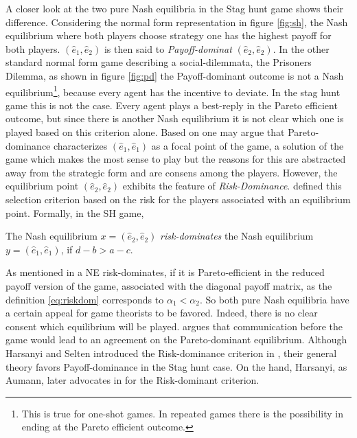 \documentclass[11pt]{article}
\begin{document}
A closer look at the two pure Nash equilibria in the Stag hunt game 
shows their difference. Considering the normal form representation in figure 
\ref{fig:sh}, the Nash equilibrium where both players choose strategy one 
has the highest payoff
for both players. $(\hat{e}_1,\hat{e}_2)$ is then said to
\textit{Payoff-dominat} $(\hat{e}_2,\hat{e}_2)$. In the other standard 
normal form game describing a social-dilemmata, the Prisoners Dilemma, as 
shown in figure \ref{fig:pd} the Payoff-dominant outcome is not a 
Nash equilibrium\footnote{This is true for one-shot games. 
In repeated games there is the possibility in ending at the Pareto efficient 
outcome.}, because every agent has the incentive to deviate. In the stag hunt
game this is not the case. Every agent plays a best-reply in the Pareto efficient
outcome, but since there is another Nash equilibrium it is not clear 
which one is played based on this criterion alone. Based on \cite{schelling}
one may argue that Pareto-dominance characterizes $(\hat{e}_1,\hat{e}_1)$ 
as a focal point of the game, a solution of the game which makes the most sense
to play but the reasons for this are abstracted away from the strategic form and are consens among
the players.  However, the equilibrium point
$(\hat{e}_2,\hat{e}_2)$ exhibits the feature of \textit{Risk-Dominance}. 
\cite{seltenharsanyigeneral} defined this selection criterion based on the
risk for the players associated with an equilibrium point. Formally, in the
SH game, 
\begin{mydef}
The Nash equilibrium $x=(\hat{e}_2,\hat{e}_2)$ \textit{risk-dominates} 
         the Nash equilibrium $y=(\hat{e}_1,\hat{e}_1)$, if $d-b > a-c$.
         \label{eq:riskdom}
 \end{mydef}
 As mentioned in \textcite{weibull_evolutionary_1997} a NE risk-dominates, if it is Pareto-efficient
 in the reduced payoff version of the game, associated with the diagonal
 payoff matrix, as the definition \eqref{eq:riskdom} 
 corresponds to $\alpha_1 < \alpha_2$.
So both pure Nash equilibria have a certain appeal for game theorists to be
favored. Indeed, there is no clear consent which equilibrium will be played. 
\cite{aumann} argues that communication before the game would lead to 
an agreement on the Pareto-dominant equilibrium.
Although Harsanyi and Selten introduced the Risk-dominance criterion in 
\cite{seltenharsanyigeneral}, their general theory favors Payoff-dominance in the
Stag hunt case. On the hand, Harsanyi, as Aumann, later advocates in \cite{harsanyinew} 
for the Risk-dominant criterion. 
\end{document}
